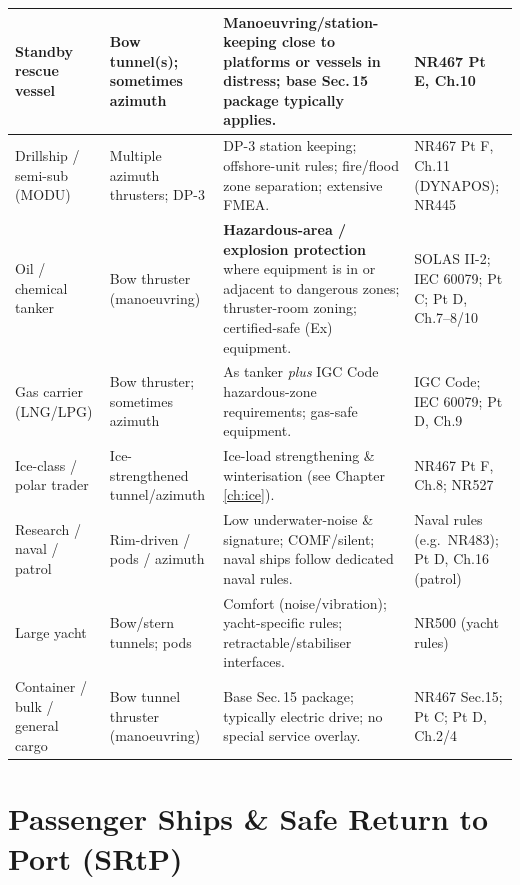 \documentclass[11pt,a4paper]{report}
\begin{document}
\begin{longtable}{|p{2.9cm}|p{3.7cm}|p{5.9cm}|p{1.8cm}|}
Standby rescue vessel & Bow tunnel(s); sometimes azimuth &
Manoeuvring/station-keeping close to platforms or vessels in distress; base
Sec.\,15 package typically applies. & NR467 Pt E, Ch.10 \\
\hline

Drillship / semi-sub (MODU) & Multiple azimuth thrusters; DP-3 &
DP-3 station keeping; offshore-unit rules; fire/flood zone separation;
extensive FMEA. & NR467 Pt F, Ch.11 (DYNAPOS); NR445 \\
\hline

Oil / chemical tanker & Bow thruster (manoeuvring) &
\textbf{Hazardous-area / explosion protection} where equipment is in or adjacent
to dangerous zones; thruster-room zoning; certified-safe (Ex) equipment. &
SOLAS II-2; IEC 60079; Pt C; Pt D, Ch.7--8/10 \\
\hline

Gas carrier (LNG/LPG) & Bow thruster; sometimes azimuth &
As tanker \emph{plus} IGC Code hazardous-zone requirements; gas-safe equipment. &
IGC Code; IEC 60079; Pt D, Ch.9 \\
\hline

Ice-class / polar trader & Ice-strengthened tunnel/azimuth &
Ice-load strengthening \& winterisation (see Chapter \ref{ch:ice}). &
NR467 Pt F, Ch.8; NR527 \\
\hline

Research / naval / patrol & Rim-driven / pods / azimuth &
Low underwater-noise \& signature; COMF/silent; naval ships follow dedicated
naval rules. & Naval rules (e.g.\ NR483); Pt D, Ch.16 (patrol) \\
\hline

Large yacht & Bow/stern tunnels; pods &
Comfort (noise/vibration); yacht-specific rules; retractable/stabiliser
interfaces. & NR500 (yacht rules) \\
\hline

Container / bulk / general cargo & Bow tunnel thruster (manoeuvring) &
Base Sec.\,15 package; typically electric drive; no special service overlay. &
NR467 Sec.15; Pt C; Pt D, Ch.2/4 \\
\hline

\end{longtable}

\section{Passenger Ships \& Safe Return to Port (SRtP)}
\end{document}
